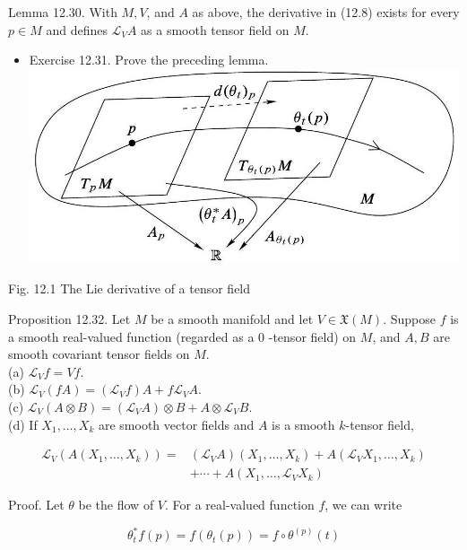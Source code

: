 \documentclass[10pt, letterpaper]{article}
\begin{document}
Lemma 12.30. With $M, V$, and $A$ as above, the derivative in (12.8) exists for every $p \in M$ and defines $\mathscr{L}_{V} A$ as a smooth tensor field on $M$.

\begin{itemize}
  \item Exercise 12.31. Prove the preceding lemma.\\
\includegraphics[max width=\textwidth, center]{2025_06_02_90020b9676379491a6e7g-340}
\end{itemize}

Fig. 12.1 The Lie derivative of a tensor field

Proposition 12.32. Let $M$ be a smooth manifold and let $V \in \mathfrak{X}(M)$. Suppose $f$ is a smooth real-valued function (regarded as a 0 -tensor field) on $M$, and $A, B$ are smooth covariant tensor fields on $M$.\\
(a) $\mathscr{L}_{V} f=V f$.\\
(b) $\mathscr{L}_{V}(f A)=\left(\mathscr{L}_{V} f\right) A+f \mathscr{L}_{V} A$.\\
(c) $\mathscr{L}_{V}(A \otimes B)=\left(\mathscr{L}_{V} A\right) \otimes B+A \otimes \mathscr{L}_{V} B$.\\
(d) If $X_{1}, \ldots, X_{k}$ are smooth vector fields and $A$ is a smooth $k$-tensor field,

$$
\begin{aligned}
\mathscr{L}_{V}\left(A\left(X_{1}, \ldots, X_{k}\right)\right)= & \left(\mathscr{L}_{V} A\right)\left(X_{1}, \ldots, X_{k}\right)+A\left(\mathscr{L}_{V} X_{1}, \ldots, X_{k}\right) \\
& +\cdots+A\left(X_{1}, \ldots, \mathscr{L}_{V} X_{k}\right)
\end{aligned}
$$

Proof. Let $\theta$ be the flow of $V$. For a real-valued function $f$, we can write

$$
\theta_{t}^{*} f(p)=f\left(\theta_{t}(p)\right)=f \circ \theta^{(p)}(t)
$$
\end{document}
